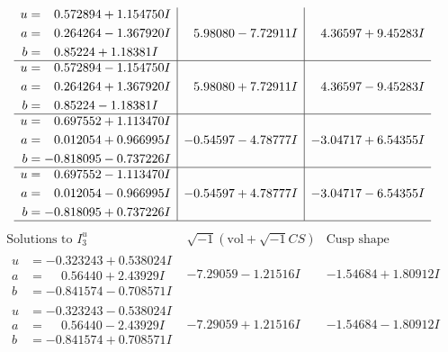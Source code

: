 \documentclass[1p]{elsarticle_modified}
\theoremstyle{definition}
\newcommand{\I}{\sqrt{-1}}
\begin{document}
$$\begin{array}{c|c|c}
\begin{aligned}
u &= \phantom{-}0.572894 + 1.154750 I \\
a &= \phantom{-}0.264264 - 1.367920 I \\
b &= \phantom{-}0.85224 + 1.18381 I\end{aligned}
 & \phantom{-}5.98080 - 7.72911 I & \phantom{-}4.36597 + 9.45283 I \\ \hline\begin{aligned}
u &= \phantom{-}0.572894 - 1.154750 I \\
a &= \phantom{-}0.264264 + 1.367920 I \\
b &= \phantom{-}0.85224 - 1.18381 I\end{aligned}
 & \phantom{-}5.98080 + 7.72911 I & \phantom{-}4.36597 - 9.45283 I \\ \hline\begin{aligned}
u &= \phantom{-}0.697552 + 1.113470 I \\
a &= \phantom{-}0.012054 + 0.966995 I \\
b &= -0.818095 - 0.737226 I\end{aligned}
 & -0.54597 - 4.78777 I & -3.04717 + 6.54355 I \\ \hline\begin{aligned}
u &= \phantom{-}0.697552 - 1.113470 I \\
a &= \phantom{-}0.012054 - 0.966995 I \\
b &= -0.818095 + 0.737226 I\end{aligned}
 & -0.54597 + 4.78777 I & -3.04717 - 6.54355 I\\
 \hline 
 \end{array}$$\newpage$$\begin{array}{c|c|c}  
\text{Solutions to }I^u_{3}& \I (\text{vol} + \sqrt{-1}CS) & \text{Cusp shape}\\
 \hline 
\begin{aligned}
u &= -0.323243 + 0.538024 I \\
a &= \phantom{-}0.56440 + 2.43929 I \\
b &= -0.841574 - 0.708571 I\end{aligned}
 & -7.29059 - 1.21516 I & -1.54684 + 1.80912 I \\ \hline\begin{aligned}
u &= -0.323243 - 0.538024 I \\
a &= \phantom{-}0.56440 - 2.43929 I \\
b &= -0.841574 + 0.708571 I\end{aligned}
 & -7.29059 + 1.21516 I & -1.54684 - 1.80912 I \\ \hline\begin{aligned}

\end{aligned}
\end{array}$$
\end{document}
